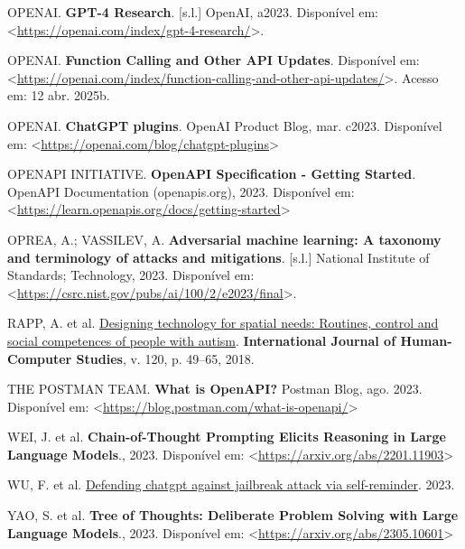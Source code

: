 \documentclass[
]{article}
\newlength{\cslhangindent}
\newenvironment{CSLReferences}[2] %
 {\begin{list}{}{%
  \setlength{\itemindent}{0pt}
  \setlength{\leftmargin}{0pt}
  \setlength{\parsep}{0pt}
  \ifodd #1
   \setlength{\leftmargin}{\cslhangindent}
   \setlength{\itemindent}{-1\cslhangindent}
  \fi
  \setlength{\itemsep}{#2\baselineskip}}}
 {\end{list}}
\begin{document}
\begin{CSLReferences}{0}{1}
OPENAI. \textbf{GPT-4 Research}. {[}s.l.{]} OpenAI, a2023. Disponível
em:
\textless{}\url{https://openai.com/index/gpt-4-research/}\textgreater.

OPENAI. \textbf{Function Calling and Other API Updates}. Disponível em:
\textless{}\url{https://openai.com/index/function-calling-and-other-api-updates/}\textgreater.
Acesso em: 12 abr. 2025b.

OPENAI. \textbf{{ChatGPT plugins}}. OpenAI Product Blog, mar. c2023.
Disponível em:
\textless{}\url{https://openai.com/blog/chatgpt-plugins}\textgreater{}

OPENAPI INITIATIVE. \textbf{{OpenAPI Specification - Getting Started}}.
OpenAPI Documentation (openapis.org), 2023. Disponível em:
\textless{}\url{https://learn.openapis.org/docs/getting-started}\textgreater{}

OPREA, A.; VASSILEV, A. \textbf{Adversarial machine learning: A taxonomy
and terminology of attacks and mitigations}. {[}s.l.{]} National
Institute of Standards; Technology, 2023. Disponível em:
\textless{}\url{https://csrc.nist.gov/pubs/ai/100/2/e2023/final}\textgreater.

RAPP, A. et al.
\href{https://doi.org/10.1016/j.ijhcs.2018.07.005}{Designing technology
for spatial needs: Routines, control and social competences of people
with autism}. \textbf{International Journal of Human-Computer Studies},
v. 120, p. 49--65, 2018.

THE POSTMAN TEAM. \textbf{{What is OpenAPI?}} Postman Blog, ago. 2023.
Disponível em:
\textless{}\url{https://blog.postman.com/what-is-openapi/}\textgreater{}

WEI, J. et al. \textbf{Chain-of-Thought Prompting Elicits Reasoning in
Large Language Models}., 2023. Disponível em:
\textless{}\url{https://arxiv.org/abs/2201.11903}\textgreater{}

WU, F. et al.
\href{https://www.researchsquare.com/article/rs-2873090/v1}{Defending
chatgpt against jailbreak attack via self-reminder}. 2023.

YAO, S. et al. \textbf{Tree of Thoughts: Deliberate Problem Solving with
Large Language Models}., 2023. Disponível em:
\textless{}\url{https://arxiv.org/abs/2305.10601}\textgreater{}

\end{CSLReferences}
\end{document}
